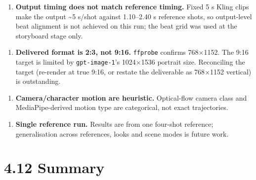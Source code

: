 \documentclass[10pt,twocolumn,letterpaper]{article}
\begin{document}
\begin{enumerate}[leftmargin=1.4em,itemsep=1pt,topsep=2pt]

\item \textbf{Output timing does not match reference timing.} Fixed 5 s Kling clips make the output \textasciitilde{}5 s/shot against 1.10--2.40 s reference shots, so output-level beat alignment is not achieved on this run; the beat grid was used at the storyboard stage only.

\end{enumerate}

\begin{enumerate}[leftmargin=1.4em,itemsep=1pt,topsep=2pt]

\item \textbf{Delivered format is 2:3, not 9:16.} \texttt{ffprobe} confirms 768$\times$1152. The 9:16 target is limited by \texttt{gpt-image-1}'s 1024$\times$1536 portrait size. Reconciling the target (re-render at true 9:16, or restate the deliverable as 768$\times$1152 vertical) is outstanding.

\end{enumerate}

\begin{enumerate}[leftmargin=1.4em,itemsep=1pt,topsep=2pt]

\item \textbf{Camera/character motion are heuristic.} Optical-flow camera class and MediaPipe-derived motion type are categorical, not exact trajectories.

\end{enumerate}

\begin{enumerate}[leftmargin=1.4em,itemsep=1pt,topsep=2pt]

\item \textbf{Single reference run.} Results are from one four-shot reference; generalisation across references, looks and scene modes is future work.

\end{enumerate}

\section*{4.12 Summary}
\end{document}
